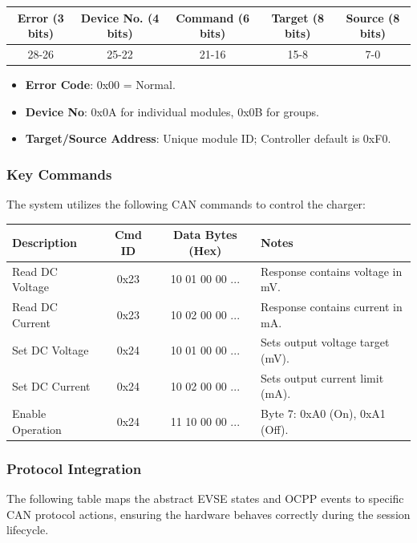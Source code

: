 \documentclass[a4paper,11pt]{report}
\begin{document}
\begin{center}
\begin{tabular}{|c|c|c|c|c|}
\hline
\textbf{Error (3 bits)} & \textbf{Device No. (4 bits)} & \textbf{Command (6 bits)} & \textbf{Target (8 bits)} & \textbf{Source (8 bits)} \\
\hline
28-26 & 25-22 & 21-16 & 15-8 & 7-0 \\
\hline
\end{tabular}
\end{center}

\begin{itemize}
    \item \textbf{Error Code}: 0x00 = Normal.
    \item \textbf{Device No}: 0x0A for individual modules, 0x0B for groups.
    \item \textbf{Target/Source Address}: Unique module ID; Controller default is 0xF0.
\end{itemize}

\subsubsection{Key Commands}
The system utilizes the following CAN commands to control the charger:

\begin{center}
\begin{tabular}{|l|c|c|l|}
\hline
\textbf{Description} & \textbf{Cmd ID} & \textbf{Data Bytes (Hex)} & \textbf{Notes} \\
\hline
Read DC Voltage & 0x23 & 10 01 00 00 ... & Response contains voltage in mV. \\
\hline
Read DC Current & 0x23 & 10 02 00 00 ... & Response contains current in mA. \\
\hline
Set DC Voltage & 0x24 & 10 01 00 00 ... & Sets output voltage target (mV). \\
\hline
Set DC Current & 0x24 & 10 02 00 00 ... & Sets output current limit (mA). \\
\hline
Enable Operation & 0x24 & 11 10 00 00 ... & Byte 7: 0xA0 (On), 0xA1 (Off). \\
\hline
\end{tabular}
\end{center}


\subsubsection{Protocol Integration}
The following table maps the abstract EVSE states and OCPP events to specific CAN protocol actions, ensuring the hardware behaves correctly during the session lifecycle.
\end{document}
